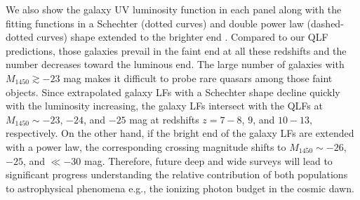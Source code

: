 \documentclass[twocolumn, twocolappendix]{aastex63}
\newcommand{\Muv}{M_{1450}}
\begin{document}
\begin{CJK*}{UTF8}{gbsn}
We also show the galaxy UV luminosity function in each panel
along with the fitting functions in a Schechter (dotted curves) and double power law (dashed-dotted curves) shape extended to the brighter end
\citep{2021AJ....162...47B,2022ApJS..259...20H,2020MNRAS.493.2059B,2022arXiv220712356D,2013MNRAS.432.2696M,2019ApJ...883...99S,
Harikane_2022b,2018ApJ...867..150M,Harikane_2022c,2016ApJ...819..129O,2022arXiv220709434N}.
Compared to our QLF predictions, those galaxies prevail in the faint end at all these redshifts and the number decreases toward the luminous end.
The large number of galaxies with $\Muv\gtrsim -23$ mag makes it difficult to probe rare quasars among those faint objects.
Since extrapolated galaxy LFs with a Schechter shape decline quickly with the luminosity increasing,
the galaxy LFs intersect with the QLFs at $\Muv \sim -23$, $-24$, and $-25$ mag at redshifts $z=7-8$, $9$, and $10-13$, respectively.
On the other hand, if the bright end of the galaxy LFs are extended with a power law, the corresponding crossing magnitude shifts to $\Muv\sim-26$, $-25$, and $\ll -30$ mag.
Therefore, future deep and wide surveys will lead to significant progress understanding the relative 
contribution of both populations to astrophysical phenomena e.g., the ionizing photon budget in the cosmic dawn.




\end{CJK*}
\end{document}
